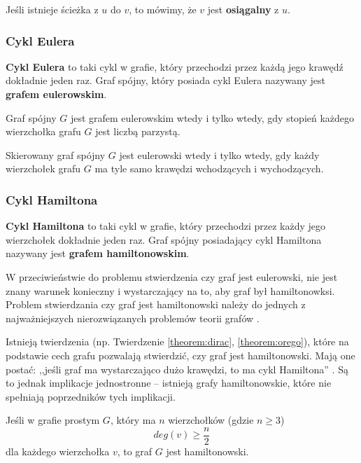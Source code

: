 Jeśli istnieje ścieżka z $u$ do $v$, to mówimy, że $v$ jest \textbf{osiągalny} z $u$.


\subsubsection*{Cykl Eulera}

\textbf{Cykl Eulera} to taki cykl w grafie, który przechodzi przez każdą jego krawędź dokładnie jeden raz. Graf spójny, który posiada cykl Eulera nazywany jest \textbf{grafem eulerowskim}. 

\begin{theorem}[Euler, 1736]
Graf spójny $G$ jest grafem eulerowskim wtedy i tylko wtedy, gdy stopień każdego wierzchołka grafu $G$ jest liczbą parzystą.
\end{theorem}

\begin{theorem}
Skierowany graf spójny $G$ jest eulerowski wtedy i tylko wtedy, gdy każdy wierzchołek grafu $G$ ma tyle samo krawędzi wchodzących i wychodzących.
\end{theorem}


\subsubsection*{Cykl Hamiltona}

\textbf{Cykl Hamiltona} to taki cykl w grafie, który przechodzi przez każdy jego wierzchołek dokładnie jeden raz. Graf spójny posiadający cykl Hamiltona nazywany jest \textbf{grafem hamiltonowskim}.

W przeciwieństwie do problemu stwierdzenia czy graf jest eulerowski, nie jest znany warunek konieczny i wystarczający na to, aby graf był hamiltonowksi. Problem stwierdzania czy graf jest hamiltonowski należy do jednych z najważniejszych nierozwiązanych problemów teorii grafów \cite[54]{wilson}. 

Istnieją twierdzenia (np. Twierdzenie \ref{theorem:dirac}, \ref{theorem:orego}), które na podstawie cech grafu pozwalają stwierdzić, czy graf jest hamiltonowski. Mają one postać: ,,jeśli graf ma wystarczająco dużo krawędzi, to ma cykl Hamiltona'' \cite[54]{wilson}. Są to jednak implikacje jednostronne -- istnieją grafy hamiltonowskie, które nie spełniają poprzedników tych implikacji. 

\begin{theorem}[Dirac, 1952]\label{theorem:dirac}
Jeśli w grafie prostym $G$, który ma $n$ wierzchołków (gdzie $n \geq 3$)
\[deg(v) \geq \frac{n}{2}\] 
dla każdego wierzchołka $v$, to graf $G$ jest hamiltonowski.
\end{theorem}


